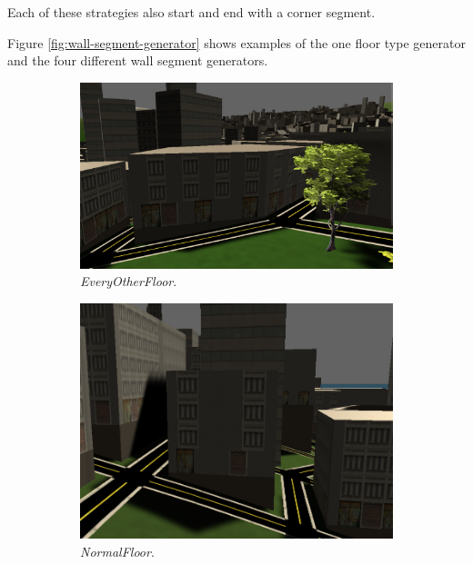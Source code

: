 Each of these strategies also start and end with a corner segment. 

Figure \ref{fig:wall-segment-generator} shows examples of the one floor type generator and the four different wall segment generators.

\begin{figure}[H]
  \centering

  \begin{subfigure}[b]{0.3\textwidth}
    \includegraphics[width=\textwidth]{figure/building-every-other.PNG}
    \caption{\textit{EveryOtherFloor}.}
  \end{subfigure}
  \quad
  \begin{subfigure}[b]{0.3\textwidth}
    \includegraphics[width=\textwidth]{figure/building-normal.PNG}
    \caption{\textit{NormalFloor}.}
  \end{subfigure}
  \quad
  \begin{subfigure}[b]{0.3\textwidth}

\end{subfigure}
\end{figure}
